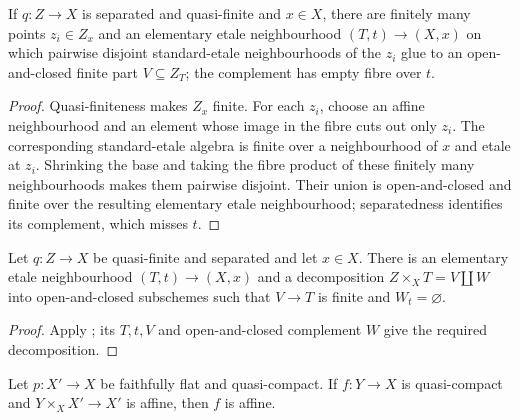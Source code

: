 \begin{lemma}
  \label{lemma:nagata-standard-etale-finite-part-package}

  If $q\colon Z\to X$ is separated and quasi-finite and $x\in X$, there are
  finitely many points $z_i\in Z_x$ and an elementary etale neighbourhood
  $(T,t)\to(X,x)$ on which pairwise disjoint standard-etale neighbourhoods of
  the $z_i$ glue to an open-and-closed finite part $V\subseteq Z_T$; the
  complement has empty fibre over $t$.
\end{lemma}

\begin{proof}
  Quasi-finiteness makes $Z_x$ finite.  For each $z_i$, choose an affine
  neighbourhood and an element whose image in the fibre cuts out only $z_i$.
  The corresponding standard-etale algebra is finite over a neighbourhood of
  $x$ and etale at $z_i$.  Shrinking the base and taking the fibre product of
  these finitely many neighbourhoods makes them pairwise disjoint.  Their
  union is open-and-closed and finite over the resulting elementary etale
  neighbourhood; separatedness identifies its complement, which misses $t$.
\end{proof}

\begin{lemma}
  \label{lemma:nagata-quasifinite-etale-finite-part}

  Let $q\colon Z\to X$ be quasi-finite and separated and let $x\in X$.
  There is an elementary etale neighbourhood $(T,t)\to(X,x)$ and a
  decomposition $Z\times_XT=V\amalg W$ into open-and-closed subschemes such
  that $V\to T$ is finite and $W_t=\varnothing$.
\end{lemma}

\begin{proof}
  Apply ; its $T,t,V$
  and open-and-closed complement $W$ give the required decomposition.
\end{proof}

\begin{lemma}
  \label{lemma:nagata-affine-fpqc-descent-package}

  Let $p\colon X'\to X$ be faithfully flat and quasi-compact.  If
  $f\colon Y\to X$ is quasi-compact and $Y\times_XX'\to X'$ is affine, then
  $f$ is affine.
\end{lemma}

